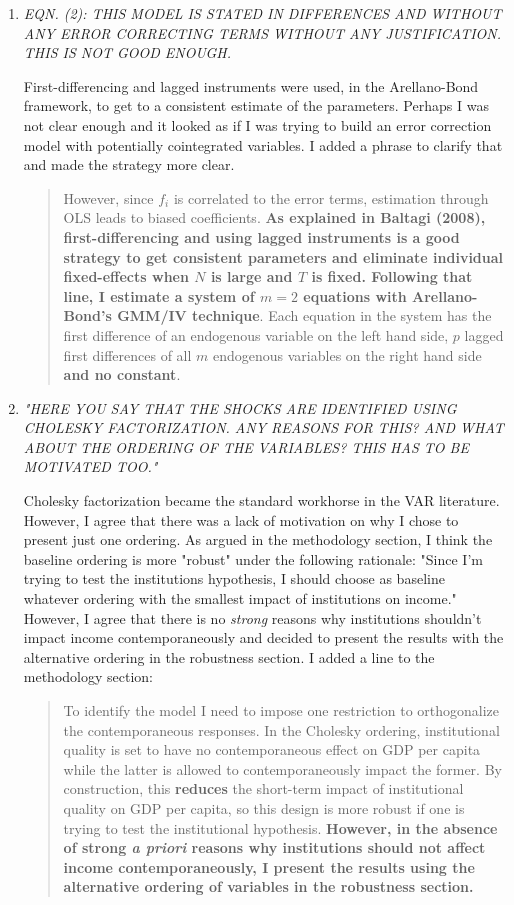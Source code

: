 \documentclass{article}
\begin{document}
\begin{enumerate}
    \item \textit{EQN. (2): THIS MODEL IS STATED IN DIFFERENCES AND WITHOUT ANY ERROR CORRECTING TERMS WITHOUT ANY JUSTIFICATION. THIS IS NOT GOOD ENOUGH.}
    
    First-differencing and lagged instruments were used, in the Arellano-Bond framework, to get to a consistent estimate of the parameters. Perhaps I was not clear enough and it looked as if I was trying to build an error correction model with potentially cointegrated variables. I added a phrase to clarify that and made the strategy more clear.
    
    \begin{quote}
        However, since $f_i$ is correlated to the error terms, estimation through OLS leads to biased coefficients. \textbf{As explained in Baltagi (2008), first-differencing and using lagged instruments is a good strategy to get consistent parameters and eliminate individual fixed-effects when $N$ is large and $T$ is fixed. Following that line, I estimate a system of $m = 2$ equations with Arellano-Bond's GMM/IV technique}. Each equation in the system has the first difference of an endogenous variable on the left hand side, $p$ lagged first differences of all $m$ endogenous variables on the right hand side\textbf{ and no constant}.
    \end{quote}

    \item \textit{"HERE YOU SAY THAT THE SHOCKS ARE IDENTIFIED USING CHOLESKY FACTORIZATION. ANY REASONS FOR THIS? AND WHAT ABOUT THE ORDERING OF THE VARIABLES? THIS HAS TO BE MOTIVATED TOO."}
    
    Cholesky factorization became the standard workhorse in the VAR literature. However, I agree that there was a lack of motivation on why I chose to present just one ordering. As argued in the methodology section, I think the baseline ordering is more "robust" under the following rationale: "Since I'm trying to test the institutions hypothesis, I should choose as baseline whatever ordering with the smallest impact of institutions on income." However, I agree that there is no \textit{strong} reasons why institutions shouldn't impact income contemporaneously and decided to present the results with the alternative ordering in the robustness section. I added a line to the methodology section:
    
    \begin{quote}
        To identify the model I need to impose one restriction to orthogonalize the contemporaneous responses. In the Cholesky ordering, institutional quality is set to have no contemporaneous effect on GDP per capita while the latter is allowed to contemporaneously impact the former. By construction, this \textbf{reduces} the short-term impact of institutional quality on GDP per capita, so this design is more robust if one is trying to test the institutional hypothesis. \textbf{However, in the absence of strong \textit{a priori} reasons why institutions should not affect income contemporaneously, I present the results using the alternative ordering of variables in the robustness section.}
    \end{quote}
    

\end{enumerate}
\end{document}
